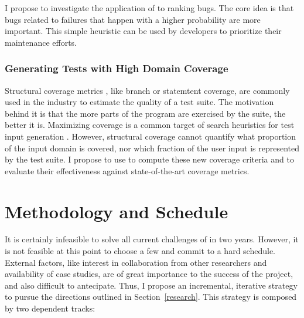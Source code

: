 \documentclass[10pt]{article}
\begin{document}
I propose to investigate the application of \PSE{} to ranking bugs. The
core idea is that bugs related to failures that happen with a higher
probability are more important. This simple heuristic can be used by
developers to prioritize their maintenance efforts. 

\subsubsection{ Generating Tests with High Domain Coverage }
\label{coverage}

Structural coverage metrics \cite{mockus2009test}, like branch or
statemtent coverage, are commonly used in the industry to estimate the
quality of a test suite. The motivation behind it is that the more
parts of the program are exercised by the suite, the better it
is. Maximizing coverage is a common target of search heuristics for
test input generation \cite{godefroid2008automated}. However,
structural coverage cannot quantify what proportion of the input
domain is covered, nor which fraction of the user input is represented
by the test suite. I propose to use \PSE{} to compute these new
coverage criteria and to evaluate their effectiveness against
state-of-the-art coverage metrics.  






\section{Methodology and Schedule}

It is certainly infeasible to solve all current challenges of \PSE{}
in two years. However, it is not feasible at this point to choose a
few and commit to a hard schedule. External factors, like interest in
collaboration from other researchers and availability of case studies,
are of great importance to the success of the project, and also
difficult to antecipate. Thus, I propose an incremental, iterative
strategy to pursue the directions outlined in Section~\ref{research}.
This strategy is composed by two dependent tracks:
\end{document}
